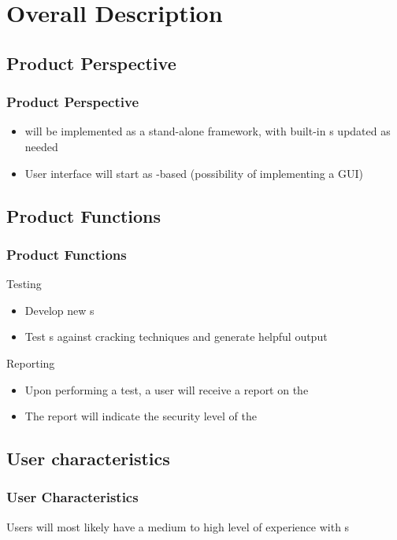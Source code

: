 
\section{Overall Description}


\subsection{Product Perspective}

\begin{frame} %
\frametitle{Product Perspective}
\begin{itemize}
\item \cry{} will be implemented as a stand-alone framework,
  with built-in \cs s updated as needed
\item User interface will start as \cl-based
  (possibility of implementing a GUI)
\end{itemize}
\end{frame}


\subsection{Product Functions}
\begin{frame}
\frametitle{Product Functions}
Testing
\begin{itemize}
  \item Develop new \cs s
  \item Test \cs s against cracking techniques and generate helpful output
\end{itemize}
Reporting
\begin{itemize}
\item Upon performing a test, a user will receive a report on
  the \cs
\item The report will indicate the security level of the \cs
\end{itemize}
\end{frame}


\subsection{User characteristics}
\begin{frame}
\frametitle{User Characteristics}
Users will most likely have a medium  to high level of
experience with \cs s
\end{frame}

